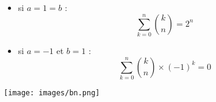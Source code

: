 \documentclass{report}
\begin{document}
          \begin{itemize}[label=$\rightarrow$]
            \item si $a=1=b$ : \[\sum_{k=0}^{n} \binom{k}{n} = 2^n\]
            \item si $a=-1$ et $b=1$ : \[\sum_{k=0}^{n} \binom{k}{n} \times (-1)^k = 0\]
          \end{itemize}

          \begin{center}
            \texttt{[image: images/bn.png]}
          \end{center}


    
          

          
        
       
\end{document}
